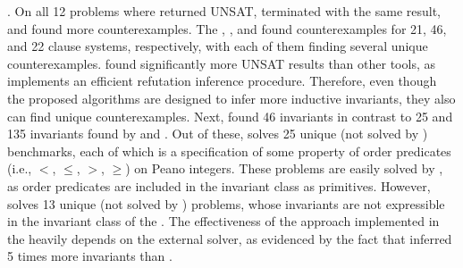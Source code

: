 \textbf{\theringen{}}. On all 12 problems where \eldarica{} returned UNSAT, \theringen{} terminated with the same result, and \theringen{} found more counterexamples.
The \ringen{\cvc{}}, \ringen{\vampire{}}, and \racer{} found counterexamples for 21, 46, and 22 clause systems, respectively, with each of them finding several unique counterexamples.
\ringen{\vampire{}} found significantly more UNSAT results than other tools, as \vampire{} implements an efficient refutation inference procedure.
Therefore, even though the proposed algorithms are designed to infer more inductive invariants, they also can find unique counterexamples.
Next, \eldarica{} found 46 invariants in contrast to 25 and 135 invariants found by \ringen{\cvc{}} and \ringen{\vampire{}}.
Out of these, \eldarica{} solves 25 unique (not solved by \ringen{\cvc{}}) benchmarks, each of which is a specification of some property of order predicates (i.\:e., $<$, $\le$, $>$, $\ge$) on Peano integers.
These problems are easily solved by \eldarica{}, as order predicates are included in the \sizeelemclass{} invariant class as primitives.
However, \ringen{\cvc{}} solves 13 unique (not solved by \eldarica{}) problems, whose invariants are not expressible in the invariant class of the \eldarica{}.
The effectiveness of the approach implemented in the \theringen{} heavily depends on the external solver, as evidenced by the fact that \ringen{\vampire{}} inferred 5 times more invariants than \ringen{\cvc{}}.


